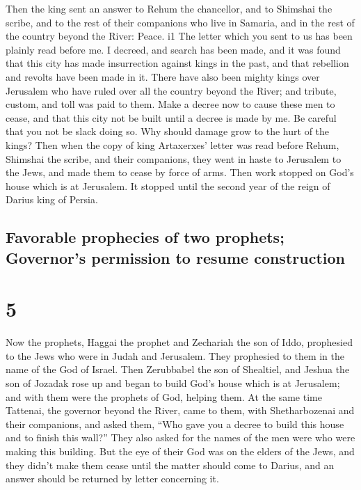  Then the king sent an answer to Rehum the chancellor,
and to Shimshai the scribe, and to the rest of their companions who live
in Samaria, and in the rest of the country beyond the River: Peace. i1
 The letter which you sent to us has been plainly read
before me.  I decreed, and search has been made, and it
was found that this city has made insurrection against kings in the
past, and that rebellion and revolts have been made in it.
 There have also been mighty kings over Jerusalem who
have ruled over all the country beyond the River; and tribute, custom,
and toll was paid to them.  Make a decree now to cause
these men to cease, and that this city not be built until a decree is
made by me.  Be careful that you not be slack doing so.
Why should damage grow to the hurt of the kings?  Then
when the copy of king Artaxerxes' letter was read before Rehum, Shimshai
the scribe, and their companions, they went in haste to Jerusalem to the
Jews, and made them to cease by force of arms.  Then work
stopped on God's house which is at Jerusalem. It stopped until the
second year of the reign of Darius king of Persia.

\hypertarget{favorable-prophecies-of-two-prophets-governors-permission-to-resume-construction}{%
\subsection{Favorable prophecies of two prophets; Governor's permission
to resume
construction}\label{favorable-prophecies-of-two-prophets-governors-permission-to-resume-construction}}

\hypertarget{section-4}{%
\section{5}\label{section-4}}

 Now the prophets, Haggai the prophet and Zechariah the
son of Iddo, prophesied to the Jews who were in Judah and Jerusalem.
They prophesied to them in the name of the God of Israel. 
Then Zerubbabel the son of Shealtiel, and Jeshua the son of Jozadak rose
up and began to build God's house which is at Jerusalem; and with them
were the prophets of God, helping them.  At the same time
Tattenai, the governor beyond the River, came to them, with
Shetharbozenai and their companions, and asked them, ``Who gave you a
decree to build this house and to finish this wall?'' 
They also asked for the names of the men were who were making this
building.  But the eye of their God was on the elders of
the Jews, and they didn't make them cease until the matter should come
to Darius, and an answer should be returned by letter concerning it.

